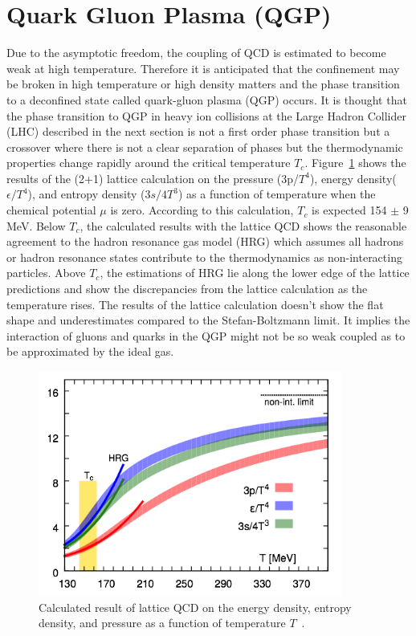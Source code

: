 \section{Quark Gluon Plasma (QGP)}
Due to the asymptotic freedom, the coupling of QCD is estimated to become weak at high temperature. %
Therefore it is anticipated that the confinement may be broken in high temperature or high density matters and the phase transition to a deconfined state called quark-gluon plasma (QGP) occurs. 
It is thought that the phase transition to QGP in heavy ion collisions at the Large Hadron Collider (LHC) described in the next section is not a first order phase transition but a crossover where there is not a clear separation of phases but the thermodynamic properties change rapidly around the critical temperature $T_{c}$. 
Figure~\ref{fig_1_lattice} shows the results of the (2+1) lattice calculation on the pressure (3p/$T^{4}$), energy density($\epsilon/T^{4}$), and entropy density ($3s/4T^{3}$) as a function of temperature when the chemical potential $\mu$ is zero\cite{bib_hotqcdlattice}.
According to this calculation, $T_{c}$ is expected 154 $\pm$ 9 MeV. 
Below $T_{c}$, the calculated results with the lattice QCD shows the reasonable agreement to the  hadron resonance gas model (HRG) which assumes all hadrons or hadron resonance states contribute to the thermodynamics as non-interacting particles.
Above $T_{c}$, the estimations of HRG lie along the lower edge of the lattice predictions and show the discrepancies from the lattice calculation as the temperature rises. 
The results of the lattice calculation doesn't show the flat shape and underestimates compared to the Stefan-Boltzmann limit. 
It implies the interaction of gluons and quarks in the QGP might not be so weak coupled as to be approximated by the ideal gas.
\begin{figure}[!h]
	 \centering
	 \includegraphics[width=10cm]{chap1/figure/hotqcdlattice.png}
  	\caption{ Calculated result of lattice QCD on the energy density, entropy density, and pressure as a function of temperature $T$~\cite{bib_hotqcdlattice}.}
 	 \label{fig_1_lattice}
\end{figure}

